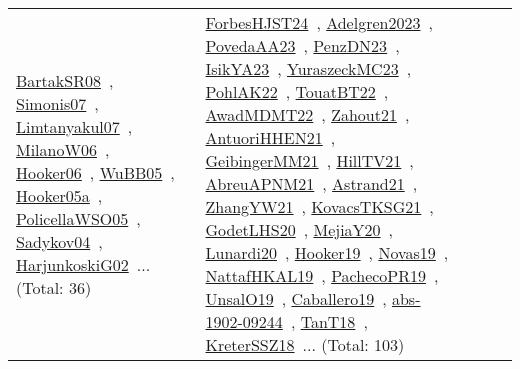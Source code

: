 {\begin{longtable}{lp{3cm}>{\raggedright\arraybackslash}p{6cm}>{\raggedright\arraybackslash}p{6cm}>{\raggedright\arraybackslash}p{8cm}}
\href{../works/BartakSR08.pdf}{BartakSR08}~\cite{BartakSR08}, \href{../works/Simonis07.pdf}{Simonis07}~\cite{Simonis07}, \href{../works/Limtanyakul07.pdf}{Limtanyakul07}~\cite{Limtanyakul07}, \href{../works/MilanoW06.pdf}{MilanoW06}~\cite{MilanoW06}, \href{../works/Hooker06.pdf}{Hooker06}~\cite{Hooker06}, \href{../works/WuBB05.pdf}{WuBB05}~\cite{WuBB05}, \href{../works/Hooker05a.pdf}{Hooker05a}~\cite{Hooker05a}, \href{../works/PolicellaWSO05.pdf}{PolicellaWSO05}~\cite{PolicellaWSO05}, \href{../works/Sadykov04.pdf}{Sadykov04}~\cite{Sadykov04}, \href{../works/HarjunkoskiG02.pdf}{HarjunkoskiG02}~\cite{HarjunkoskiG02}... (Total: 36) & \href{../works/ForbesHJST24.pdf}{ForbesHJST24}~\cite{ForbesHJST24}, \href{../works/Adelgren2023.pdf}{Adelgren2023}~\cite{Adelgren2023}, \href{../works/PovedaAA23.pdf}{PovedaAA23}~\cite{PovedaAA23}, \href{../works/PenzDN23.pdf}{PenzDN23}~\cite{PenzDN23}, \href{../works/IsikYA23.pdf}{IsikYA23}~\cite{IsikYA23}, \href{../works/YuraszeckMC23.pdf}{YuraszeckMC23}~\cite{YuraszeckMC23}, \href{../works/PohlAK22.pdf}{PohlAK22}~\cite{PohlAK22}, \href{../works/TouatBT22.pdf}{TouatBT22}~\cite{TouatBT22}, \href{../works/AwadMDMT22.pdf}{AwadMDMT22}~\cite{AwadMDMT22}, \href{../works/Zahout21.pdf}{Zahout21}~\cite{Zahout21}, \href{../works/AntuoriHHEN21.pdf}{AntuoriHHEN21}~\cite{AntuoriHHEN21}, \href{../works/GeibingerMM21.pdf}{GeibingerMM21}~\cite{GeibingerMM21}, \href{../works/HillTV21.pdf}{HillTV21}~\cite{HillTV21}, \href{../works/AbreuAPNM21.pdf}{AbreuAPNM21}~\cite{AbreuAPNM21}, \href{../works/Astrand21.pdf}{Astrand21}~\cite{Astrand21}, \href{../works/ZhangYW21.pdf}{ZhangYW21}~\cite{ZhangYW21}, \href{../works/KovacsTKSG21.pdf}{KovacsTKSG21}~\cite{KovacsTKSG21}, \href{../works/GodetLHS20.pdf}{GodetLHS20}~\cite{GodetLHS20}, \href{../works/MejiaY20.pdf}{MejiaY20}~\cite{MejiaY20}, \href{../works/Lunardi20.pdf}{Lunardi20}~\cite{Lunardi20}, \href{../works/Hooker19.pdf}{Hooker19}~\cite{Hooker19}, \href{../works/Novas19.pdf}{Novas19}~\cite{Novas19}, \href{../works/NattafHKAL19.pdf}{NattafHKAL19}~\cite{NattafHKAL19}, \href{../works/PachecoPR19.pdf}{PachecoPR19}~\cite{PachecoPR19}, \href{../works/UnsalO19.pdf}{UnsalO19}~\cite{UnsalO19}, \href{../works/Caballero19.pdf}{Caballero19}~\cite{Caballero19}, \href{../works/abs-1902-09244.pdf}{abs-1902-09244}~\cite{abs-1902-09244}, \href{../works/TanT18.pdf}{TanT18}~\cite{TanT18}, \href{../works/KreterSSZ18.pdf}{KreterSSZ18}~\cite{KreterSSZ18}... (Total: 103)\\

\end{longtable}}

